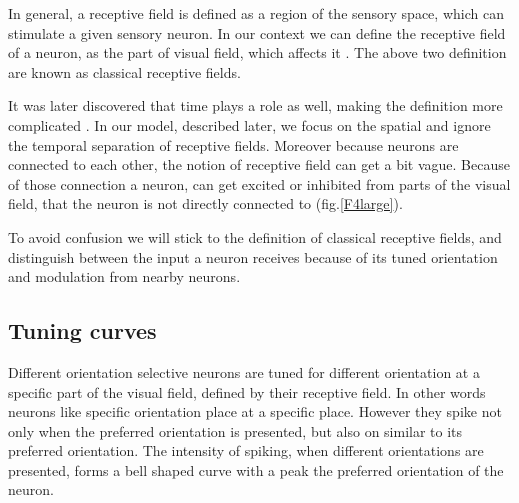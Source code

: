 In general, a receptive field is defined as a region of the sensory space, which can stimulate a given sensory neuron. In our context we can define the receptive field of a neuron, as the part of visual field, which affects it \cite{Hartline700}. The above two definition are known as classical receptive fields.

It was later discovered that time plays a role as well, making the definition more complicated \cite{deangelis1995receptive}. In our model, described later, we focus on the spatial and ignore the temporal separation of receptive fields. Moreover because neurons are connected to each other, the notion of receptive field can get a bit vague. Because of those connection a neuron, can get excited or inhibited from parts of the visual field, that the neuron is not directly connected to (fig.\ref{F4large}).

To avoid confusion we will stick to the definition of classical receptive fields, and distinguish between the input a neuron receives because of its tuned orientation and modulation from nearby neurons.


\subsection{Tuning curves}

Different orientation selective neurons are tuned for different orientation at a specific part of the visual field, defined by their receptive field. In other words neurons like specific orientation place at a specific place. However they spike not only when the preferred orientation is presented, but also on similar to its preferred orientation. The intensity of spiking, when different orientations are presented, forms a bell shaped curve with a peak the preferred orientation of the neuron. 

